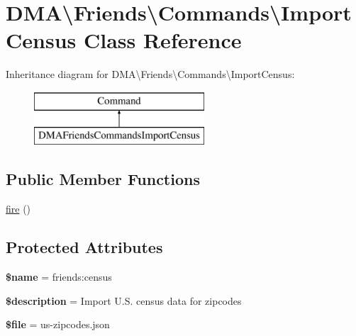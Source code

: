 \hypertarget{classDMA_1_1Friends_1_1Commands_1_1ImportCensus}{}\section{D\+M\+A\textbackslash{}Friends\textbackslash{}Commands\textbackslash{}Import\+Census Class Reference}
\label{classDMA_1_1Friends_1_1Commands_1_1ImportCensus}
Inheritance diagram for D\+M\+A\textbackslash{}Friends\textbackslash{}Commands\textbackslash{}Import\+Census\+:\begin{figure}[H]
\begin{center}
\leavevmode
\includegraphics[height=2.000000cm]{df/d2f/classDMA_1_1Friends_1_1Commands_1_1ImportCensus}
\end{center}
\end{figure}
\subsection*{Public Member Functions}
\begin{DoxyCompactItemize}
\item 
\hyperlink{classDMA_1_1Friends_1_1Commands_1_1ImportCensus_a36a88f2276966118b82a7e3ab03ac1c3}{fire} ()
\end{DoxyCompactItemize}
\subsection*{Protected Attributes}
\begin{DoxyCompactItemize}
\item 
\hypertarget{classDMA_1_1Friends_1_1Commands_1_1ImportCensus_aa1a9476de7e922b2ec8dc9927984f205}{}{\bfseries \$name} = \textquotesingle{}friends\+:census\textquotesingle{}\label{classDMA_1_1Friends_1_1Commands_1_1ImportCensus_aa1a9476de7e922b2ec8dc9927984f205}

\item 
\hypertarget{classDMA_1_1Friends_1_1Commands_1_1ImportCensus_a74d7d4ded09edd25f3df35f83a3c05e0}{}{\bfseries \$description} = \textquotesingle{}Import U.\+S. census data for zipcodes\textquotesingle{}\label{classDMA_1_1Friends_1_1Commands_1_1ImportCensus_a74d7d4ded09edd25f3df35f83a3c05e0}

\item 
\hypertarget{classDMA_1_1Friends_1_1Commands_1_1ImportCensus_a45e98b52dec99786659ae0b6dcdb4fa8}{}{\bfseries \$file} = \textquotesingle{}us-\/zipcodes.\+json\textquotesingle{}\label{classDMA_1_1Friends_1_1Commands_1_1ImportCensus_a45e98b52dec99786659ae0b6dcdb4fa8}

\end{DoxyCompactItemize}



